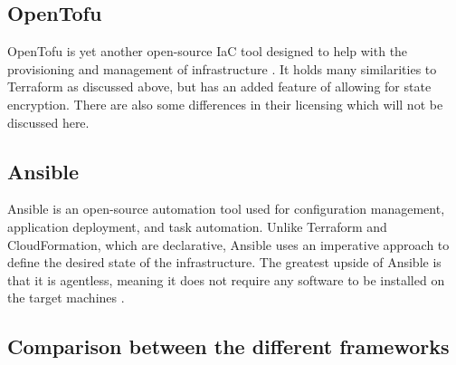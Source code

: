 \subsection{OpenTofu}
OpenTofu is yet another open-source IaC tool designed to help with the provisioning and management of infrastructure \cite{dinu-2024}. It holds many similarities to Terraform as discussed above, but has an added feature of allowing for state encryption. There are also some differences in their licensing which will not be discussed here. 

\subsection{Ansible}
Ansible is an open-source automation tool used for configuration management, application deployment, and task automation. Unlike Terraform and CloudFormation, which are declarative, Ansible uses an imperative approach to define the desired state of the infrastructure. The greatest upside of Ansible is that it is agentless, meaning it does not require any software to be installed on the target machines \cite{red-hat-no-date}.

\subsection{Comparison between the different frameworks}

